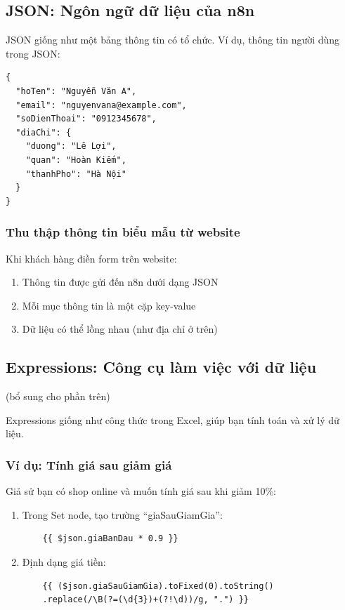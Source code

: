 \subsection{JSON: Ngôn ngữ dữ liệu của n8n}

JSON giống như một bảng thông tin có tổ chức. Ví dụ, thông tin người dùng trong JSON:

\begin{verbatim}
{
  "hoTen": "Nguyễn Văn A",
  "email": "nguyenvana@example.com",
  "soDienThoai": "0912345678",
  "diaChi": {
    "duong": "Lê Lợi",
    "quan": "Hoàn Kiếm",
    "thanhPho": "Hà Nội"
  }
}
\end{verbatim}

\subsubsection{Thu thập thông tin biểu mẫu từ website}

Khi khách hàng điền form trên website:
\begin{enumerate}
    \item Thông tin được gửi đến n8n dưới dạng JSON
    \item Mỗi mục thông tin là một cặp key-value
    \item Dữ liệu có thể lồng nhau (như địa chỉ ở trên)
\end{enumerate}

\subsection{Expressions: Công cụ làm việc với dữ liệu}

(bổ sung cho phần trên)

Expressions giống như công thức trong Excel, giúp bạn tính toán và xử lý dữ liệu.

\subsubsection{Ví dụ: Tính giá sau giảm giá}

Giả sử bạn có shop online và muốn tính giá sau khi giảm 10\%:

\begin{enumerate}
    \item Trong Set node, tạo trường ``giaSauGiamGia'':
    \begin{verbatim}
    {{ $json.giaBanDau * 0.9 }}
    \end{verbatim}

    \item Định dạng giá tiền:
    \begin{verbatim}
    {{ ($json.giaSauGiamGia).toFixed(0).toString()
    .replace(/\B(?=(\d{3})+(?!\d))/g, ".") }}
    \end{verbatim}
\end{enumerate}

